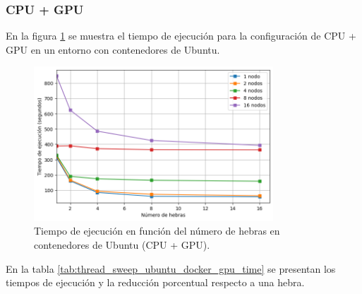 \subsubsection{CPU + GPU}

En la figura \ref{fig:thread_sweep_ubuntu_docker_gpu_time} se muestra el tiempo de ejecución para la configuración de CPU + GPU en un entorno con contenedores de Ubuntu.

\begin{figure}[ht]
    \centering
    \includegraphics[width=0.8\textwidth]{imagenes/cap5/thread_sweep_ubuntu_docker_gpu_time.png}
    \caption{Tiempo de ejecución en función del número de hebras en contenedores de Ubuntu (CPU + GPU).}
    \label{fig:thread_sweep_ubuntu_docker_gpu_time}
\end{figure}

En la tabla \ref{tab:thread_sweep_ubuntu_docker_gpu_time} se presentan los tiempos de ejecución y la reducción porcentual respecto a una hebra.

